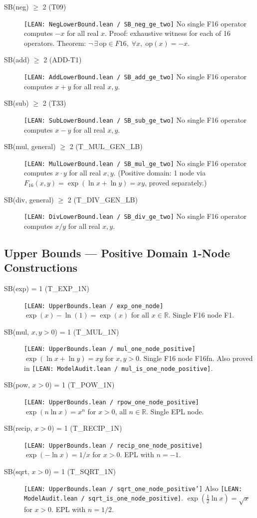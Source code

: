 \documentclass[11pt]{article}
\newcommand{\lean}[2]{\textcolor{leangreen}{\texttt{[LEAN: #1 / #2]}}}
\begin{document}
\begin{description}
\item[SB(neg) $\geq$ 2 (T09)]
  \lean{NegLowerBound.lean}{SB\_neg\_ge\_two}
  No single F16 operator computes $-x$ for all real $x$. Proof: exhaustive witness for
  each of 16 operators. Theorem: $\neg\,\exists\,\text{op}\in F16,\;\forall x,\;\text{op}(x) = -x$.

\item[SB(add) $\geq$ 2 (ADD-T1)]
  \lean{AddLowerBound.lean}{SB\_add\_ge\_two}
  No single F16 operator computes $x+y$ for all real $x,y$.

\item[SB(sub) $\geq$ 2 (T33)]
  \lean{SubLowerBound.lean}{SB\_sub\_ge\_two}
  No single F16 operator computes $x-y$ for all real $x,y$.

\item[SB(mul, general) $\geq$ 2 (T\_MUL\_GEN\_LB)]
  \lean{MulLowerBound.lean}{SB\_mul\_ge\_two}
  No single F16 operator computes $x \cdot y$ for all real $x,y$.
  (Positive domain: 1 node via $F_{16}(x,y) = \exp(\ln x + \ln y) = xy$, proved separately.)

\item[SB(div, general) $\geq$ 2 (T\_DIV\_GEN\_LB)]
  \lean{DivLowerBound.lean}{SB\_div\_ge\_two}
  No single F16 operator computes $x/y$ for all real $x,y$.
\end{description}

\subsection{Upper Bounds — Positive Domain 1-Node Constructions}

\begin{description}
\item[SB(exp) = 1 (T\_EXP\_1N)]
  \lean{UpperBounds.lean}{exp\_one\_node}
  $\exp(x) - \ln(1) = \exp(x)$ for all $x \in \mathbb{R}$. Single F16 node F1.

\item[SB(mul, $x,y>0$) = 1 (T\_MUL\_1N)]
  \lean{UpperBounds.lean}{mul\_one\_node\_positive}
  $\exp(\ln x + \ln y) = xy$ for $x,y > 0$. Single F16 node F16fn.
  Also proved in \lean{ModelAudit.lean}{mul\_is\_one\_node\_positive}.

\item[SB(pow, $x>0$) = 1 (T\_POW\_1N)]
  \lean{UpperBounds.lean}{rpow\_one\_node\_positive}
  $\exp(n \ln x) = x^n$ for $x > 0$, all $n \in \mathbb{R}$. Single EPL node.

\item[SB(recip, $x>0$) = 1 (T\_RECIP\_1N)]
  \lean{UpperBounds.lean}{recip\_one\_node\_positive}
  $\exp(-\ln x) = 1/x$ for $x > 0$. EPL with $n = -1$.

\item[SB(sqrt, $x>0$) = 1 (T\_SQRT\_1N)]
  \lean{UpperBounds.lean}{sqrt\_one\_node\_positive'}
  Also \lean{ModelAudit.lean}{sqrt\_is\_one\_node\_positive}.
  $\exp(\tfrac{1}{2}\ln x) = \sqrt{x}$ for $x > 0$. EPL with $n = 1/2$.
\end{description}
\end{document}
